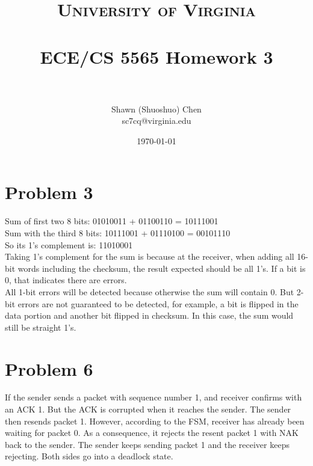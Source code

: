 \documentclass[titlepage, paper=a4, fontsize=11pt]{scrartcl} %
\title{	
\normalfont \normalsize 
\textsc{University of Virginia} \\ [25pt] %
\horrule{0.5pt} \\[0.4cm] %
\huge ECE/CS 5565 Homework 3 \\ %
\horrule{2pt} \\[0.5cm] %
}
\author{Shawn (Shuoshuo) Chen\\sc7cq@virginia.edu} %
\date{\normalsize\today} %
\numberwithin{equation}{section} %
\numberwithin{figure}{section} %
\numberwithin{table}{section} %
\begin{document}
\maketitle %


\section*{Problem 3}

Sum of first two 8 bits: 01010011 + 01100110 = 10111001 \\
Sum  with the third 8 bits: 10111001 + 01110100 = 00101110 \\
So its 1's complement is: 11010001 \\
Taking 1's complement for the sum is because at the receiver, when adding all 16-bit words
including the checksum, the result expected should be all 1's. If a bit is 0, that indicates there
are errors. \\

All 1-bit errors will be detected because otherwise the sum will contain 0. But 2-bit errors are
not guaranteed to be detected, for example, a bit is flipped in the data portion and another bit
flipped in checksum. In this case, the sum would still be straight 1's.
\\



\section*{Problem 6}
If the sender sends a packet with sequence number 1, and receiver confirms with an ACK 1.
But the ACK is corrupted when it reaches the sender. The sender then resends packet 1. However,
according to the FSM, receiver has already been waiting for packet 0. As a consequence, it rejects
the resent packet 1 with NAK back to the sender. The sender keeps sending packet 1 and the receiver
keeps rejecting. Both sides go into a deadlock state.
\\


\end{document}

